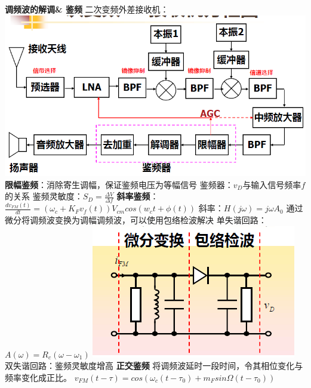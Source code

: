 \documentclass[10.5pt,landscape]{article}
\begin{document}
\begin{multicols*}{4}
\textbf{调频波的解调\& 鉴频}\newline
二次变频外差接收机：
 \includegraphics[scale=0.3]{外差1}\newline
\textbf{ 限幅鉴频}：消除寄生调幅，保证鉴频电压为等幅信号\newline
 鉴频器：$v_D$与输入信号频率$f$的关系\newline
 鉴频灵敏度：$S_D = \frac{\Delta V}{\Delta f}$ \newline
\textbf{ 斜率鉴频}：$\frac{dv_{FM}(t)}{dt} = (\omega_c + K_Fv_f(t))V_{cm}cos(w_c t + \phi(t))$ \newline
 斜率：$H(j\omega) = j\omega A_0$ \newline
 通过微分将调频波变换为调幅调频波，可以使用包络检波解决\newline
 单失谐回路：$A(\omega)= R_c(\omega - \omega_1)$ \newline
  \includegraphics[scale=0.4]{单失谐}\newline
 双失谐回路：鉴频灵敏度增高 \newline
 \textbf{正交鉴频}\newline
 将调频波延时一段时间，令其相位变化与频率变化成正比。\newline
 $v_{FM}(t - \tau) = cos(\omega_c(t - \tau_0) + m_F sin \Omega (t - \tau_0))$ \newline

\end{multicols*}
\end{document}
